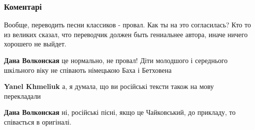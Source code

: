  
 
 
 
 
\subsubsection{Коментарі}

\begin{itemize}
 

Вообще, переводить песни классиков - провал. Как ты на это согласилась? Кто то
из великих сказал, что переводчик должен быть гениальнее автора, иначе ничего
хорошего не выйдет.

\begin{itemize}
 
\textbf{Дана Волконская} це нормально, не провал!
Діти молодшого і середнього шкільного віку не співають німецькою Баха і Бетховена
\begin{itemize}
 
\textbf{Yanel Khmeliuk} а, я думала, що ви російські тексти також на мову перекладали

 
\textbf{Дана Волконская} ні, російські пісні, якщо це Чайковський, до прикладу, то співається в оригіналі.
\end{itemize}


\end{itemize}
\end{itemize}
